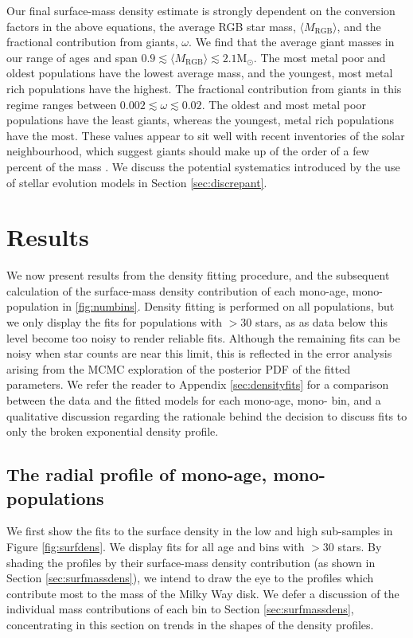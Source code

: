 Our final surface-mass density estimate is strongly dependent on the conversion factors in the above equations, the average RGB star mass, $\langle M_{\mathrm{RGB}} \rangle$, and the fractional contribution from giants, $\omega$. We find that the average giant masses in our range of ages and \feh{} span $0.9 \lesssim \langle M_{\mathrm{RGB}} \rangle \lesssim 2.1 \mathrm{M_{\odot}}$. The most metal poor and oldest populations have the lowest average mass, and the youngest, most metal rich populations have the highest. The fractional contribution from giants in this regime ranges between $0.002 \lesssim \omega \lesssim 0.02 $. The oldest and most metal poor populations have the least giants, whereas the youngest, metal rich populations have the most. These values appear to sit well with recent inventories of the solar neighbourhood, which suggest giants should make up of the order of a few percent of the mass \citep{2015ApJ...814...13M}. We discuss the potential systematics introduced by the use of stellar evolution models in Section \ref{sec:discrepant}.


\section{Results}
\label{sec:resultsa}
We now present results from the density fitting procedure, and the subsequent calculation of the surface-mass density contribution of each mono-age, mono-\feh{} population in \autoref{fig:numbins}. Density fitting is performed on all populations, but we only display the fits for populations with $> 30$ stars, as as data below this level become too noisy to render reliable fits. Although the remaining fits can be noisy when star counts are near this limit, this is reflected in the error analysis arising from the MCMC exploration of the posterior PDF of the fitted parameters. We refer the reader to Appendix \ref{sec:densityfits} for a comparison between the data and the fitted models for each mono-age, mono-\feh{} bin, and a qualitative discussion regarding the rationale behind the decision to discuss fits to only the broken exponential density profile.

\subsection{The radial profile of mono-age, mono-\feh{} populations}
We first show the fits to the surface density in the low and high \afe{} sub-samples in Figure \ref{fig:surfdens}. We display fits for all age and \feh{} bins with $> 30$ stars. By shading the profiles by their surface-mass density contribution (as shown in Section \ref{sec:surfmassdens}), we intend to draw the eye to the profiles which contribute most to the mass of the Milky Way disk. We defer a discussion of the individual mass contributions of each bin to Section \ref{sec:surfmassdens}, concentrating in this section on trends in the shapes of the density profiles. 


